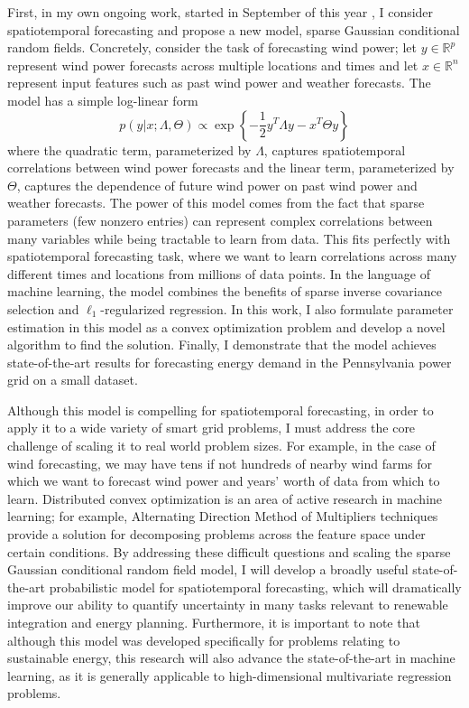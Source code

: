 \documentclass[12pt]{article}
\begin{document}
First, in my own ongoing work, started in September of this year \cite{wytock.12}, I consider spatiotemporal forecasting and propose a new model, sparse Gaussian conditional random fields. Concretely, consider the task of forecasting wind power; let $y \in \mathbb{R}^p$ represent wind power forecasts across multiple locations and times and let $x \in \mathbb{R}^n$ represent input features such as past wind power and weather forecasts. The model has a simple log-linear form
\begin{equation}
p(y|x;\Lambda,\Theta) \propto \exp \left\{ -\frac{1}{2}y^T\Lambda y - x^T\Theta y \right\}
\end{equation}
where the quadratic term, parameterized by $\Lambda$, captures spatiotemporal correlations between wind power forecasts and the linear term, parameterized by $\Theta$, captures the dependence of future wind power on past wind power and weather forecasts. The power of this model comes from the fact that sparse parameters (few nonzero entries) can represent complex correlations between many variables while being tractable to learn from data. This fits perfectly with spatiotemporal forecasting task, where we want to learn correlations across many different times and locations from millions of data points. In the language of machine learning, the model combines the benefits of sparse inverse covariance selection \cite{banerjee.08} and $\ell_1$-regularized regression. In this work,  I also formulate parameter estimation in this model as a convex optimization problem and develop a novel algorithm to find the solution. Finally, I demonstrate that the model achieves state-of-the-art results for forecasting energy demand in the Pennsylvania power grid on a small dataset.

Although this model is compelling for spatiotemporal forecasting, in order to apply it to a wide variety of smart grid problems, I must address the core challenge of scaling it to real world problem sizes. For example, in the case of wind forecasting, we may have tens if not hundreds of nearby wind farms for which we want to forecast wind power and years' worth of data from which to learn. Distributed convex optimization is an area of active research in machine learning; for example, Alternating Direction Method of Multipliers techniques \cite{boyd.11} provide a solution for decomposing problems across the feature space under certain conditions. By addressing these difficult questions and scaling the sparse Gaussian conditional random field model, I will develop a broadly useful state-of-the-art probabilistic model for spatiotemporal forecasting, which will dramatically improve our ability to quantify uncertainty in many tasks relevant to renewable integration and energy planning. Furthermore, it is important to note that although this model was developed specifically for problems relating to sustainable energy, this research will also advance the state-of-the-art in machine learning, as it is generally applicable to high-dimensional multivariate regression problems.
\end{document}
